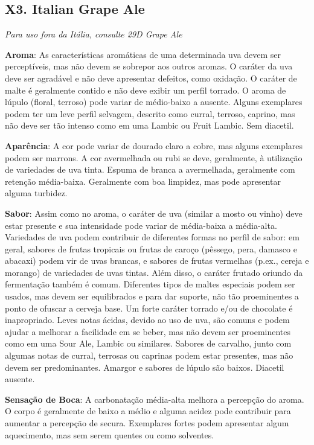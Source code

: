 \subsection*{X3. Italian Grape Ale}

\textit{Para uso fora da Itália, consulte 29D Grape Ale}

\textbf{Aroma}: As características aromáticas de uma determinada uva devem ser perceptíveis, mas não devem se sobrepor aos outros aromas. O caráter da uva deve ser agradável e não deve apresentar defeitos, como oxidação. O caráter de malte é geralmente contido e não deve exibir um perfil torrado. O aroma de lúpulo (floral, terroso) pode variar de médio-baixo a ausente. Alguns exemplares podem ter um leve perfil selvagem, descrito como curral, terroso, caprino, mas não deve ser tão intenso como em uma Lambic ou Fruit Lambic. Sem diacetil.

\textbf{Aparência}: A cor pode variar de dourado claro a cobre, mas alguns exemplares podem ser marrons. A cor avermelhada ou rubi se deve, geralmente, à utilização de variedades de uva tinta. Espuma de branca a avermelhada, geralmente com retenção média-baixa. Geralmente com boa limpidez, mas pode apresentar alguma turbidez.

\textbf{Sabor}: Assim como no aroma, o caráter de uva (similar a mosto ou vinho) deve estar presente e sua intensidade pode variar de média-baixa a média-alta. Variedades de uva podem contribuir de diferentes formas no perfil de sabor: em geral, sabores de frutas tropicais ou frutas de caroço (pêssego, pera, damasco e abacaxi) podem vir de uvas brancas, e sabores de frutas vermelhas (p.ex., cereja e morango) de variedades de uvas tintas. Além disso, o caráter frutado oriundo da fermentação também é comum. Diferentes tipos de maltes especiais podem ser usados, mas devem ser equilibrados e para dar suporte, não tão proeminentes a ponto de ofuscar a cerveja base. Um forte caráter torrado e/ou de chocolate é inapropriado. Leves notas ácidas, devido ao uso de uva, são comuns e podem ajudar a melhorar a facilidade em se beber, mas não devem ser proeminentes como em uma Sour Ale, Lambic ou similares. Sabores de carvalho, junto com algumas notas de curral, terrosas ou caprinas podem estar presentes, mas não devem ser predominantes. Amargor e sabores de lúpulo são baixos. Diacetil ausente.

\textbf{Sensação de Boca}: A carbonatação média-alta melhora a percepção do aroma. O corpo é geralmente de baixo a médio e alguma acidez pode contribuir para aumentar a percepção de secura. Exemplares fortes podem apresentar algum aquecimento, mas sem serem quentes ou como solventes.

